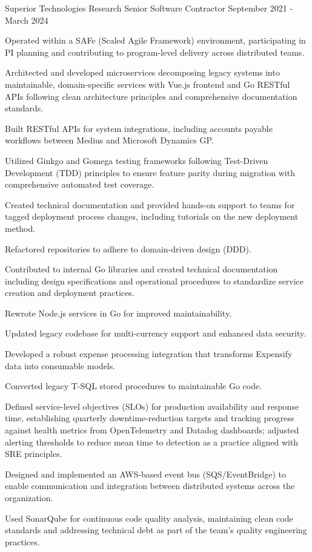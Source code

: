 \documentclass{../styles/cv}
\begin{document}
\subsectionpositiondate
    {Superior Technologies Research}
    {Senior Software Contractor}
    {September 2021 - March 2024}
\resumesublistbegin
    \item Operated within a SAFe (Scaled Agile Framework) environment, participating in PI planning and contributing to program-level delivery across distributed teams.
    \item Architected and developed microservices decomposing legacy systems into maintainable, domain-specific services with Vue.js frontend and Go RESTful APIs following clean architecture principles and comprehensive documentation standards.
    \item Built RESTful APIs for system integrations, including accounts payable workflows between Medius and Microsoft Dynamics GP.
    \item Utilized Ginkgo and Gomega testing frameworks following Test-Driven Development (TDD) principles to ensure feature parity during migration with comprehensive automated test coverage.
    \item Created technical documentation and provided hands-on support to teams for tagged deployment process changes, including tutorials on the new deployment method.
    \item Refactored repositories to adhere to domain-driven design (DDD).
    \item Contributed to internal Go libraries and created technical documentation including design specifications and operational procedures to standardize service creation and deployment practices.
    \item Rewrote Node.js services in Go for improved maintainability.
    \item Updated legacy codebase for multi-currency support and enhanced data security.
    \item Developed a robust expense processing integration that transforms Expensify data into consumable models.
    \item Converted legacy T-SQL stored procedures to maintainable Go code.
    \item Defined service-level objectives (SLOs) for production availability and response time, establishing quarterly downtime-reduction targets and tracking progress against health metrics from OpenTelemetry and Datadog dashboards; adjusted alerting thresholds to reduce mean time to detection as a practice aligned with SRE principles.
    \item Designed and implemented an AWS-based event bus (SQS/EventBridge) to enable communication and integration between distributed systems across the organization.
    \item Used SonarQube for continuous code quality analysis, maintaining clean code standards and addressing technical debt as part of the team's quality engineering practices.
\resumesublistend
\end{document}
